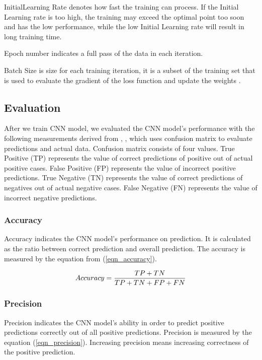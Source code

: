 \documentclass[conference]{IEEEtran}
\begin{document}
InitialLearning Rate denotes how fast the training can process. If the Initial Learning rate is too high, the training may exceed the optimal point too soon and has the low performance, while the low Initial Learning rate will result in long training time.  

Epoch number indicates a full pass of the data in each iteration.

Batch Size is size for each training iteration, it is a subset of the training set that is used to evaluate the gradient of the loss function and update the weights \cite{b7}.


\subsection{Evaluation}

After we train CNN model, we evaluated the CNN model's performance with the following measurements derived from \cite{b5}, \cite{b6}, which uses confusion matrix to evaluate predictions and actual data. Confusion matrix consists of four values. True Positive (TP) represents the value of correct predictions of positive out of actual positive cases. False Positive (FP) represents the value of incorrect positive predictions. True Negative (TN) represents the value of correct predictions of negatives out of actual negative cases. False Negative (FN) represents the value of incorrect negative predictions.

\subsubsection{Accuracy}
Accuracy indicates the CNN model's performance on prediction. It is calculated as the ratio between correct prediction and overall prediction. The accuracy is measured by the equation from (\ref{eqn_accuracy}). 

\begin{equation}
Accuracy = \frac{TP + TN}{TP + TN + FP + FN} \\
\label{eqn_accuracy}
\end{equation}

\subsubsection{Precision}
Precision indicates the CNN model's ability in order to predict positive predictions correctly out of all positive predictions.  Precision is measured by the equation (\ref{eqn_precision}). Increasing precision means increasing correctness of the positive prediction.
\end{document}
